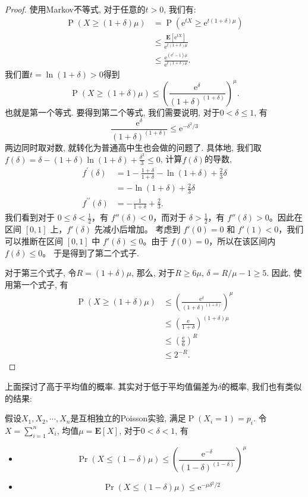 \begin{proof}
    使用Markov不等式, 对于任意的$t>0$, 我们有: 
    $$
\begin{aligned}
\operatorname{P}(X \geq(1+\delta) \mu) & =\operatorname{P}\left(\mathrm{e}^{t X} \geq \mathrm{e}^{t(1+\delta) \mu}\right) \\
& \leq \frac{\mathbf{E}\left[\mathrm{e}^{t X}\right]}{\mathrm{e}^{t(1+\delta) \mu}} \\
& \leq \frac{\mathrm{e}^{\left(\mathrm{e}^t-1\right) \mu}}{\mathrm{e}^{t(1+\delta) \mu}} .
\end{aligned}
$$
我们置$t=\ln(1+\delta)>0$得到
$$
\operatorname{P}(X \geq(1+\delta) \mu) \leq\left(\frac{\mathrm{e}^\delta}{(1+\delta)^{(1+\delta)}}\right)^\mu.
$$
也就是第一个等式. 要得到第二个等式, 我们需要说明, 对于$0<\delta\leq 1$, 有
$$
\frac{\mathrm{e}^\delta}{(1+\delta)^{(1+\delta)}} \leq \mathrm{e}^{-\delta^2 / 3}
$$
两边同时取对数, 就转化为普通高中生也会做的问题了. 具体地, 我们取$f(\delta)=\delta-(1+\delta) \ln (1+\delta)+\frac{\delta^2}{3} \leq 0$, 计算$f(\delta)$的导数, 
$$
\begin{aligned}
f^{\prime}(\delta) & =1-\frac{1+\delta}{1+\delta}-\ln (1+\delta)+\frac{2}{3} \delta \\
& =-\ln (1+\delta)+\frac{2}{3} \delta \\
f^{\prime \prime}(\delta) & =-\frac{1}{1+\delta}+\frac{2}{3} .
\end{aligned}
$$
我们看到对于 $0 \leq \delta < \frac{1}{2}$，有 $f''(\delta) < 0$，而对于 $\delta > \frac{1}{2}$，有 $f''(\delta) > 0$。因此在区间 $[0, 1]$ 上，$f'(\delta)$ 先减小后增加。
考虑到 $f'(0) = 0$ 和 $f'(1) < 0$，我们可以推断在区间 $[0, 1]$ 中 $f'(\delta) \leq 0$。由于 $f(0) = 0$，所以在该区间内 $f(\delta) \leq 0$。
于是得到了第二个式子. 

对于第三个式子, 令$R=(1+\delta) \mu$, 那么, 对于$R\geq 6\mu$, $\delta=R / \mu-1 \geq 5$. 因此, 使用第一个式子, 有$$\begin{aligned} \operatorname{P}(X \geq(1+\delta) \mu) & \leq\left(\frac{\mathrm{e}^\delta}{(1+\delta)^{(1+\delta)}}\right)^\mu \\ & \leq\left(\frac{\mathrm{e}}{1+\delta}\right)^{(1+\delta) \mu} \\ & \leq\left(\frac{\mathrm{e}}{6}\right)^R \\ & \leq 2^{-R} .\end{aligned}$$
\end{proof}

上面探讨了高于平均值的概率. 其实对于低于平均值偏差为$\delta$的概率, 我们也有类似的结果: 
\begin{theorem}
    假设$X_1, X_2, \cdots, X_n$是互相独立的Poisson实验, 满足$\operatorname{P}\left(X_i=1\right)=p_i$. 令$X=\sum_{i=1}^n X_i$, 均值$\mu=\mathbf{E}[X]$, 对于$0<\delta<1$, 有
    \begin{itemize}
        \item $$\operatorname{Pr}(X \leq(1-\delta) \mu) \leq\left(\frac{\mathrm{e}^{-\delta}}{(1-\delta)^{(1-\delta)}}\right)^\mu$$
        \item $$\operatorname{Pr}(X \leq(1-\delta) \mu) \leq \mathrm{e}^{-\mu \delta^2 / 2}$$
    \end{itemize}
\end{theorem}




